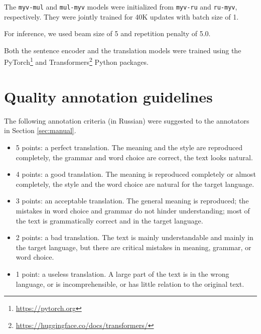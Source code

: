 \documentclass[11pt]{article}
\begin{document}
The \texttt{myv-mul} and \texttt{mul-myv} models were initialized from \texttt{myv-ru} and \texttt{ru-myv}, respectively. They were jointly trained for 40K updates with batch size of 1. 

For inference, we used beam size of 5 and repetition penalty of 5.0.

Both the sentence encoder and the translation models were trained using the PyTorch\footnote{\url{https://pytorch.org}} and Transformers\footnote{\url{https://huggingface.co/docs/transformers/}} Python packages. 






\section{Quality annotation guidelines}
\label{app:guidelines}

The following annotation criteria (in Russian) were suggested to the annotators in Section \ref{sec:manual}.

\begin{itemize}
    \item 5 points: a perfect translation. The meaning and the style are reproduced completely, the grammar and word choice are correct, the text looks natural. \item 4 points: a good translation. The meaning is reproduced completely or almost completely, the style and the word choice are natural for the target language.   \item 3 points: an acceptable translation. The general meaning is reproduced; the mistakes in word choice and grammar do not hinder understanding; most of the text is grammatically correct and in the target language.\item 2 points: a bad translation. The text is mainly understandable and mainly in the target language, but there are critical mistakes in meaning, grammar, or word choice. \item 1 point: a useless translation. A large part of the text is in the wrong language, or is incomprehensible, or has little relation to the original text. \end{itemize}
\end{document}
